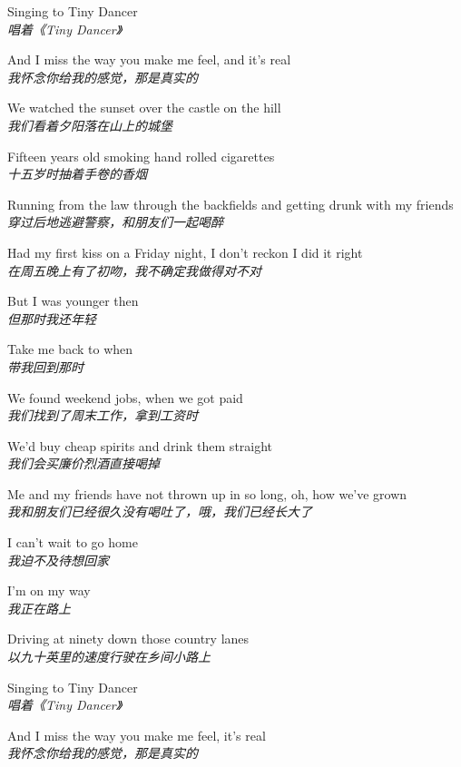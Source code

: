 \begin{spacing}{1.5}
\begin{flushleft}
Singing to Tiny Dancer\\
\textit{唱着《Tiny Dancer》}\lyricspace

And I miss the way you make me feel, and it's real\\
\textit{我怀念你给我的感觉，那是真实的}\lyricspace

We watched the sunset over the castle on the hill\\
\textit{我们看着夕阳落在山上的城堡}\lyricspace

Fifteen years old smoking hand rolled cigarettes\\
\textit{十五岁时抽着手卷的香烟}\lyricspace

Running from the law through the backfields and getting drunk with my friends\\
\textit{穿过后地逃避警察，和朋友们一起喝醉}\lyricspace

Had my first kiss on a Friday night, I don't reckon I did it right\\
\textit{在周五晚上有了初吻，我不确定我做得对不对}\lyricspace

But I was younger then\\
\textit{但那时我还年轻}\lyricspace

Take me back to when\\
\textit{带我回到那时}\lyricspace

We found weekend jobs, when we got paid\\
\textit{我们找到了周末工作，拿到工资时}\lyricspace

We'd buy cheap spirits and drink them straight\\
\textit{我们会买廉价烈酒直接喝掉}\lyricspace

Me and my friends have not thrown up in so long, oh, how we've grown\\
\textit{我和朋友们已经很久没有喝吐了，哦，我们已经长大了}\lyricspace

I can't wait to go home\\
\textit{我迫不及待想回家}\lyricspace

I'm on my way\\
\textit{我正在路上}\lyricspace

Driving at ninety down those country lanes\\
\textit{以九十英里的速度行驶在乡间小路上}\lyricspace

Singing to Tiny Dancer\\
\textit{唱着《Tiny Dancer》}\lyricspace

And I miss the way you make me feel, it's real\\
\textit{我怀念你给我的感觉，那是真实的}\lyricspace


\end{flushleft}
\end{spacing}
